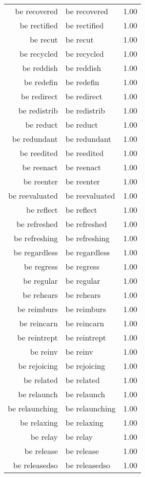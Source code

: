 \begin{table}[ht]
\begin{tabular}{rlr}
  be recovered & be recovered & 1.00 \\ 
  be rectified & be rectified & 1.00 \\ 
  be recut & be recut & 1.00 \\ 
  be recycled & be recycled & 1.00 \\ 
  be reddish & be reddish & 1.00 \\ 
  be redefin & be redefin & 1.00 \\ 
  be redirect & be redirect & 1.00 \\ 
  be redistrib & be redistrib & 1.00 \\ 
  be reduct & be reduct & 1.00 \\ 
  be redundant & be redundant & 1.00 \\ 
  be reedited & be reedited & 1.00 \\ 
  be reenact & be reenact & 1.00 \\ 
  be reenter & be reenter & 1.00 \\ 
  be reevaluated & be reevaluated & 1.00 \\ 
  be reflect & be reflect & 1.00 \\ 
  be refreshed & be refreshed & 1.00 \\ 
  be refreshing & be refreshing & 1.00 \\ 
  be regardless & be regardless & 1.00 \\ 
  be regress & be regress & 1.00 \\ 
  be regular & be regular & 1.00 \\ 
  be rehears & be rehears & 1.00 \\ 
  be reimburs & be reimburs & 1.00 \\ 
  be reincarn & be reincarn & 1.00 \\ 
  be reintrept & be reintrept & 1.00 \\ 
  be reinv & be reinv & 1.00 \\ 
  be rejoicing & be rejoicing & 1.00 \\ 
  be related & be related & 1.00 \\ 
  be relaunch & be relaunch & 1.00 \\ 
  be relaunching & be relaunching & 1.00 \\ 
  be relaxing & be relaxing & 1.00 \\ 
  be relay & be relay & 1.00 \\ 
  be release & be release & 1.00 \\ 
  be releasedso & be releasedso & 1.00 \\ 

\end{tabular}
\end{table}
